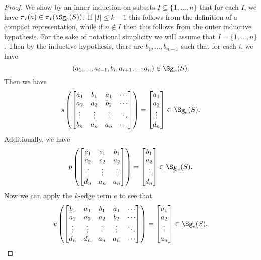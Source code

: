 \begin{proof}
We show by an inner induction on subsets $I \subseteq \{1, ..., n\}$ that for each $I$, we have $\pi_I(a) \in \pi_I(\Sg_e(S))$. If $|I| \le k-1$ this follows from the definition of a compact representation, while if $n \not\in I$ then this follows from the outer inductive hypothesis. For the sake of notational simplicity we will assume that $I = \{1, ..., n\}$. Then by the inductive hypothesis, there are $b_1, ..., b_{n-1}$ such that for each $i$, we have
\[
(a_1, ..., a_{i-1}, b_i, a_{i+1}, ..., a_n) \in \Sg_e(S).
\]
Then we have
\[
s\left(\begin{bmatrix} a_1 & b_1 & a_1 & \cdots\\ a_2 & a_2 & b_2 & \cdots\\ \vdots & \vdots & \vdots & \ddots\\ b_n & a_n & a_n & \cdots\end{bmatrix}\right) = \begin{bmatrix} a_1\\ a_2\\ \vdots\\ d_n\end{bmatrix} \in \Sg_e(S).
\]
Additionally, we have
\[
p\left(\begin{bmatrix} c_1 & c_1 & b_1\\ c_2 & c_2 & a_2\\ \vdots & \vdots & \vdots\\ d_n & a_n & a_n\end{bmatrix}\right) = \begin{bmatrix} b_1\\ a_2\\ \vdots\\ d_n\end{bmatrix} \in \Sg_e(S).
\]
Now we can apply the $k$-edge term $e$ to see that
\[
e\left(\begin{bmatrix} b_1 & a_1 & b_1 & a_1 & \cdots\\ a_2 & a_2 & a_2 & b_2 & \cdots\\ \vdots & \vdots & \vdots & \vdots & \ddots\\ d_n & d_n & a_n & a_n & \cdots\end{bmatrix}\right) = \begin{bmatrix} a_1\\ a_2\\ \vdots\\ a_n\end{bmatrix} \in \Sg_e(S).\qedhere
\]
\end{proof}

